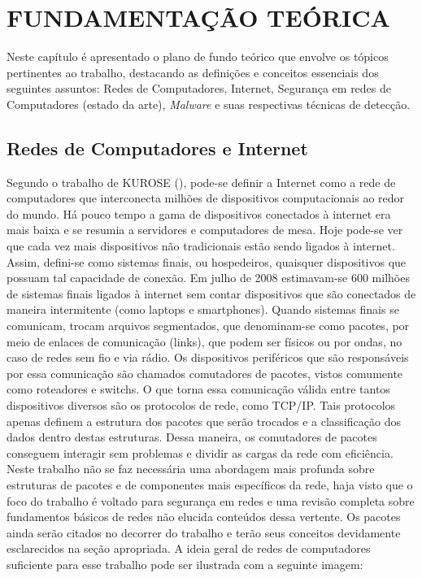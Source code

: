 
\chapter{FUNDAMENTAÇÃO TEÓRICA}
\label{c.fundamentacao}

Neste capítulo é apresentado o plano de fundo teórico que envolve os tópicos
pertinentes ao trabalho, destacando as definições e conceitos essenciais dos
seguintes assuntos: Redes de Computadores, Internet, Segurança em redes de
Computadores (estado da arte), \textit{Malware} e suas respectivas técnicas de
detecção.
\section{Redes de Computadores e Internet}
\label{s.teoria_redes_internet}

Segundo o trabalho de KUROSE (\citeyear{kurose09}), pode-se definir a Internet
como a rede de computadores que interconecta milhões de dispositivos
computacionais ao redor do mundo. Há pouco tempo a gama de dispositivos
conectados à internet era mais baixa e se resumia a servidores e computadores
de mesa. Hoje pode-se ver que cada vez mais dispositivos não tradicionais
estão sendo ligados à internet. Assim, defini-se como sistemas finais, ou
hospedeiros, quaisquer dispositivos que possuam tal capacidade de conexão. Em
julho de 2008 estimavam-se 600 milhões de sistemas finais ligados à internet
sem contar dispositivos que são conectados de maneira intermitente (como
laptops e smartphones). Quando sistemas finais se comunicam, trocam arquivos
segmentados, que denominam-se como pacotes, por meio de enlaces de comunicação
(links), que podem ser físicos ou por ondas, no caso de redes sem fio e via
rádio. Os dispositivos periféricos que são responsáveis por essa comunicação
são chamados comutadores de pacotes, vistos comumente como roteadores e
switchs. O que torna essa comunicação válida entre tantos dispositivos
diversos são os protocolos de rede, como TCP/IP. Tais protocolos apenas
definem a estrutura dos pacotes que serão trocados e a classificação dos dados
dentro destas estruturas. Dessa maneira, os comutadores de pacotes conseguem
interagir sem problemas e dividir as cargas da rede com eficiência. Neste
trabalho não se faz necessária uma abordagem mais profunda sobre estruturas de
pacotes e de componentes mais específicos da rede, haja visto que o foco do
trabalho é voltado para segurança em redes e uma revisão completa sobre
fundamentos básicos de redes não elucida conteúdos dessa vertente. Os pacotes
ainda serão citados no decorrer do trabalho e terão seus conceitos devidamente
esclarecidos na seção apropriada. A ideia geral de redes de computadores
suficiente para esse trabalho pode ser ilustrada com a seguinte imagem:


